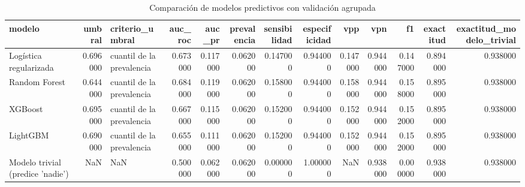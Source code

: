 \begin{table}[htbp]
\caption{Comparación de modelos predictivos con validación agrupada}
\label{tab:tabla_28_comparacion_modelos_ml}
\begin{tabular}{lrlrrrrrrrrrr}
\toprule
modelo & umbral & criterio\_umbral & auc\_roc & auc\_pr & prevalencia & sensibilidad & especificidad & vpp & vpn & f1 & exactitud & exactitud\_modelo\_trivial \\
\midrule
Logística regularizada & 0.696000 & cuantil de la prevalencia & 0.673000 & 0.117000 & 0.062000 & 0.147000 & 0.944000 & 0.147000 & 0.944000 & 0.147000 & 0.894000 & 0.938000 \\
Random Forest & 0.644000 & cuantil de la prevalencia & 0.684000 & 0.119000 & 0.062000 & 0.158000 & 0.944000 & 0.158000 & 0.944000 & 0.158000 & 0.895000 & 0.938000 \\
XGBoost & 0.695000 & cuantil de la prevalencia & 0.667000 & 0.115000 & 0.062000 & 0.152000 & 0.944000 & 0.152000 & 0.944000 & 0.152000 & 0.895000 & 0.938000 \\
LightGBM & 0.690000 & cuantil de la prevalencia & 0.655000 & 0.111000 & 0.062000 & 0.152000 & 0.944000 & 0.152000 & 0.944000 & 0.152000 & 0.895000 & 0.938000 \\
Modelo trivial (predice 'nadie') & NaN & NaN & 0.500000 & 0.062000 & 0.062000 & 0.000000 & 1.000000 & NaN & 0.938000 & 0.000000 & 0.938000 & 0.938000 \\
\bottomrule
\end{tabular}
\end{table}
